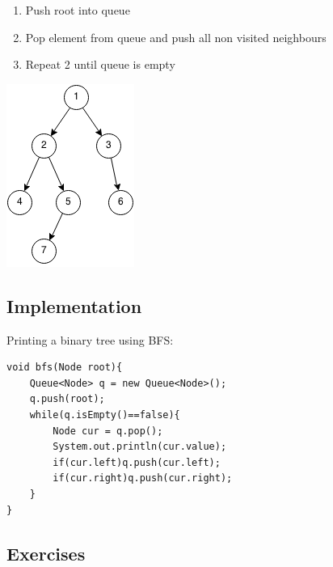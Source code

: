 \documentclass[11pt,oneside]{book}
\makeatletter
\def\maxwidth#1{\ifdim\Gin@nat@width>#1 #1\else\Gin@nat@width\fi}
\makeatother
\begin{document}
\begin{enumerate}
\item Push root into queue
\item Pop element from queue and push all non visited neighbours
\item Repeat 2 until queue is empty
\end{enumerate}

\includegraphics[width=\maxwidth{\textwidth}]{bfs.png}

\subsection{Implementation}

Printing a binary tree using BFS:

\begin{lstlisting}
void bfs(Node root){
    Queue<Node> q = new Queue<Node>();
    q.push(root);
    while(q.isEmpty()==false){
        Node cur = q.pop();
        System.out.println(cur.value);
        if(cur.left)q.push(cur.left);
        if(cur.right)q.push(cur.right);
    }
}
\end{lstlisting}

\subsection{Exercises}
\end{document}

